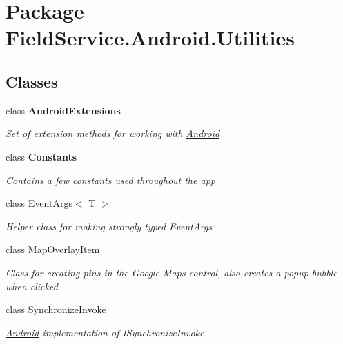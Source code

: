 \hypertarget{namespace_field_service_1_1_android_1_1_utilities}{\section{Package Field\+Service.\+Android.\+Utilities}
\label{namespace_field_service_1_1_android_1_1_utilities}
}
\subsection*{Classes}
\begin{DoxyCompactItemize}
\item 
class {\bfseries Android\+Extensions}
\begin{DoxyCompactList}\small\item\em Set of extension methods for working with \hyperlink{namespace_field_service_1_1_android}{Android} \end{DoxyCompactList}\item 
class {\bfseries Constants}
\begin{DoxyCompactList}\small\item\em Contains a few constants used throughout the app \end{DoxyCompactList}\item 
class \hyperlink{class_field_service_1_1_android_1_1_utilities_1_1_event_args_3_01_t_01_4}{Event\+Args$<$ T $>$}
\begin{DoxyCompactList}\small\item\em Helper class for making strongly typed Event\+Args \end{DoxyCompactList}\item 
class \hyperlink{class_field_service_1_1_android_1_1_utilities_1_1_map_overlay_item}{Map\+Overlay\+Item}
\begin{DoxyCompactList}\small\item\em Class for creating pins in the Google Maps control, also creates a popup bubble when clicked \end{DoxyCompactList}\item 
class \hyperlink{class_field_service_1_1_android_1_1_utilities_1_1_synchronize_invoke}{Synchronize\+Invoke}
\begin{DoxyCompactList}\small\item\em \hyperlink{namespace_field_service_1_1_android}{Android} implementation of I\+Synchronize\+Invoke \end{DoxyCompactList}\end{DoxyCompactItemize}
